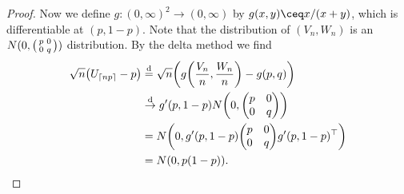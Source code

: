 \begin{proof}
    Now we define $g \colon (0, \infty)^2 \to (0, \infty)$ by $g(x, y) \ceq x / (x + y)$, which is differentiable at $(p, 1 - p)$. Note that the distribution of $(V_n, W_n)$ is an $N(0, \smqty(p & 0 \\ 0 & q))$ distribution. By the delta method we find
    \begin{align*}
        \sqrt n \qty(U_{\ceil{np}} - p) &\deq \sqrt n\qty( g\qty(\frac{V_n}{n}, \frac{W_n}{n}) - g(p, q)) \\
        &\todist g'(p, 1-p) N\qty(0, \mqty(p & 0 \\ 0 & q)) \\
        &= N\qty(0, g'(p, 1-p) \mqty(p & 0 \\ 0 & q) g'(p, 1-p)\T) \\
        &= N(0, p(1-p)).                                                                                                                                                                                                                                                                                                                                                                                                                                                                                                                                                                                                                                                                                                                                                                                                                                                                                                                                                                                                                                                                                                                                                                                                                                                                                                                                                                                                                                                                                                                                                                                                                                                                                                                                                                                                                                                                                                                                                                                                                                                                                                                                        
    \end{align*}
\end{proof}

